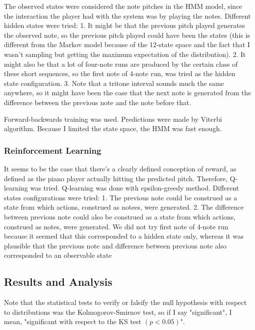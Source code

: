 \documentclass{article}
\begin{document}
The observed states were considered the note pitches in the HMM model, since the interaction the player had with the system was by playing the notes.
Different hidden states were tried:
1. It might be that the previous pitch played generates the observed note, so the previous pitch played could have been the states (this is different from the Markov model because of the 12-state space and the fact that I wasn't sampling but getting the maximum expectation of the distribution).
2. It might also be that a lot of four-note runs are produced by the certain class of these short sequences, so the first note of 4-note run, was tried as the hidden state configuration.
3. Note that a tritone interval sounds much the same anywhere, so it might have been the case that the next note is generated from the difference between the previous note and the note before that.

Forward-backwards training was used. Predictions were made by Viterbi algorithm. Because I limited the state space, the HMM was fast enough. %

\subsubsection*{Reinforcement Learning}
It seems to be the case that there's a clearly defined conception of reward, as defined as the piano player actually hitting the predicted pitch. Therefore, Q-learning was tried.
Q-learning was done with epsilon-greedy method. Different states configurations were tried:
1. The previous note could be construed as a state from which actions, construed as notees, were generated.
2. The difference between previous note could also be construed as a state from which actions, construed as notes, were generated.
We did not try first note of 4-note run because it seemed that this corresponded to a hidden state only, whereas it was plausible that the previous note and difference between previous note also corresponded to an observable state

\subsection*{Results and Analysis}
Note that the statistical tests to verify or falsify the null hypothesis with respect to distributions was the Kolmogorov-Smirnov test, so if I say "significant", I mean, "significant with respect to the KS test $(p<0.05)$".
\end{document}
